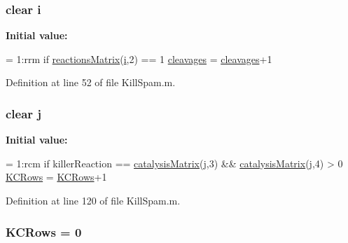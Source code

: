 \hypertarget{a00023_ac870e1cd47f6d78f16a98a24c8392fcf}{
\subsubsection[{i}]{ clear i}}\label{a00023_ac870e1cd47f6d78f16a98a24c8392fcf}
{\bfseries Initial value\-:}
\begin{DoxyCode}
= 1:rrm
        \textcolor{keywordflow}{if} \hyperlink{a00021_ac52097a2745fcef31eb175d2e9485845}{reactionsMatrix}(\hyperlink{a00021_a1de1a45bc56b002aa1ad94bb5f54a1ca}{i},2) == 1
            \hyperlink{a00021_a89060c6979e5a4ff7b0985b35f295695}{cleavages} = \hyperlink{a00021_a89060c6979e5a4ff7b0985b35f295695}{cleavages}+1
\end{DoxyCode}


Definition at line 52 of file Kill\-Spam.\-m.

\hypertarget{a00023_ad34e9c7e9ae69ae0b9f1866faed5e4ad}{
\subsubsection[{j}]{\setlength{\rightskip}{0pt plus 5cm}clear j}}\label{a00023_ad34e9c7e9ae69ae0b9f1866faed5e4ad}
{\bfseries Initial value\-:}
\begin{DoxyCode}
= 1:rcm
                \textcolor{keywordflow}{if} killerReaction == \hyperlink{a00021_a0810027f58d6be965e44b7b84c44ace8}{catalysisMatrix}(\hyperlink{a00022_ad34e9c7e9ae69ae0b9f1866faed5e4ad}{j},3) && 
      \hyperlink{a00021_a0810027f58d6be965e44b7b84c44ace8}{catalysisMatrix}(\hyperlink{a00022_ad34e9c7e9ae69ae0b9f1866faed5e4ad}{j},4) > 0
                    \hyperlink{a00023_a62227634d3ceda9bf932c630583da2b9}{KCRows} = \hyperlink{a00023_a62227634d3ceda9bf932c630583da2b9}{KCRows}+1
\end{DoxyCode}


Definition at line 120 of file Kill\-Spam.\-m.

\hypertarget{a00023_a62227634d3ceda9bf932c630583da2b9}{
\subsubsection[{K\-C\-Rows}]{\setlength{\rightskip}{0pt plus 5cm}K\-C\-Rows = 0}}\label{a00023_a62227634d3ceda9bf932c630583da2b9}



